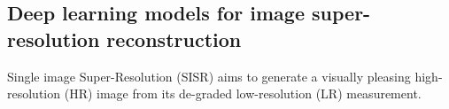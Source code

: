 \subsection{Deep learning models for image super-resolution reconstruction}
\label{proposed_approach}
Single image Super-Resolution (SISR) aims to generate a visually pleasing high-resolution (HR) image from its de-graded low-resolution (LR) measurement.